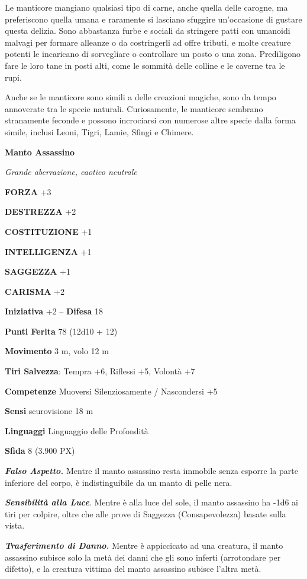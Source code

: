 \begin{multicols}{2}
Le manticore mangiano qualsiasi tipo di carne, anche quella delle carogne, ma preferiscono quella umana e raramente si lasciano sfuggire un'occasione di gustare questa delizia. Sono abbastanza furbe e sociali da stringere patti con umanoidi malvagi per formare alleanze o da costringerli ad offre tributi, e molte creature potenti le incaricano di sorvegliare o controllare un posto o una zona. Prediligono fare le loro tane in posti alti, come le sommità delle colline e le caverne tra le rupi.

Anche se le manticore sono simili a delle creazioni magiche, sono da tempo annoverate tra le specie naturali. Curiosamente, le manticore sembrano stranamente feconde e possono incrociarsi con numerose altre specie dalla forma simile, inclusi Leoni, Tigri, Lamie, Sfingi e Chimere.

\medskip{}\textbf{Manto Assassino}

\textit{Grande aberrazione, caotico neutrale}

\textbf{FORZA} +3

\textbf{DESTREZZA} +2

\textbf{COSTITUZIONE} +1

\textbf{INTELLIGENZA} +1

\textbf{SAGGEZZA} +1

\textbf{CARISMA} +2

\textbf{Iniziativa} +2 -- \textbf{Difesa} 18

\textbf{Punti Ferita} 78 (12d10 + 12)

\textbf{Movimento} 3 m, volo 12 m

\textbf{Tiri Salvezza}: Tempra +6, Riflessi +5, Volontà +7

\textbf{Competenze} Muoversi Silenziosamente / Nascondersi +5

\textbf{Sensi} scurovisione 18 m

\textbf{Linguaggi} Linguaggio delle Profondità

\textbf{Sfida} 8 (3.900 PX)

\textit{\textbf{Falso Aspetto.}} Mentre il manto assassino resta immobile senza esporre la parte inferiore del corpo, è indistinguibile da un manto di pelle nera.

\textit{\textbf{Sensibilità alla Luce}}. Mentre è alla luce del sole, il manto assassino ha -1d6 ai tiri per colpire, oltre che alle prove di Saggezza (Consapevolezza) basate sulla vista.

\textit{\textbf{Trasferimento di Danno.}} Mentre è appiccicato ad una creatura, il manto assassino subisce solo la metà dei danni che gli sono inferti (arrotondare per difetto), e la creatura vittima del manto assassino subisce l'altra metà.


\end{multicols}
